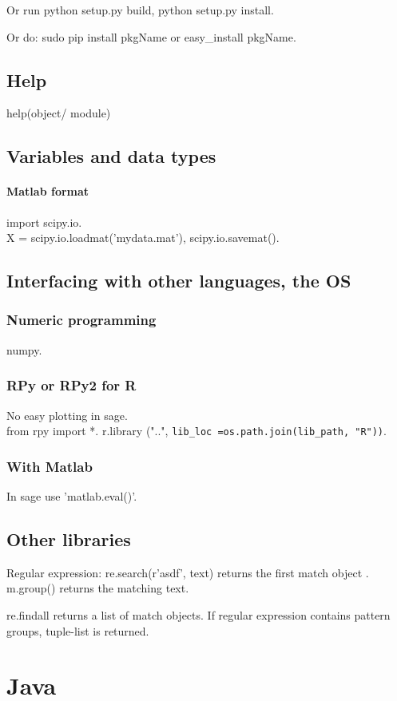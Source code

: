 Or run python setup.py build, python setup.py install.

Or do: sudo pip install pkgName or easy\_install pkgName.

\section{Help}
help(object/ module)

\section{Variables and data types}
\subsubsection{Matlab format}
import scipy.io. \\
X = scipy.io.loadmat('mydata.mat'), scipy.io.savemat().

\section{Interfacing with other languages, the OS}
\subsection{Numeric programming}
numpy.

\subsection{RPy or RPy2 for R}
No easy plotting in sage.\\
 from rpy import *. r.library ("..",  \verb'lib_loc =os.path.join(lib_path, "R"))'.

\subsection{With Matlab}
In sage use 'matlab.eval()'.

\section{Other libraries}
Regular expression: re.search(r'asdf', text) returns the first match object . m.group() returns the matching text.

re.findall returns a list of match objects. If regular expression contains pattern groups, tuple-list is returned.

\chapter{Java}

